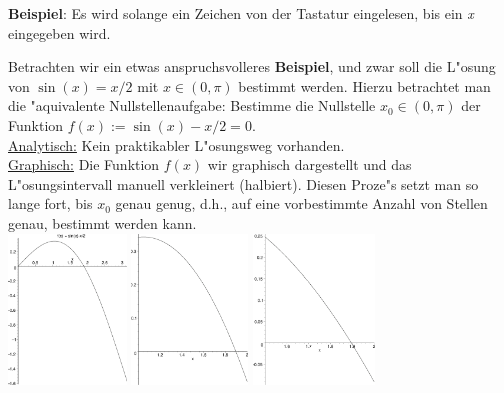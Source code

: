 \textbf{Beispiel}: Es wird solange ein Zeichen von der
Tastatur eingelesen, bis ein \textit{x} eingegeben wird.
%

Betrachten wir ein etwas anspruchsvolleres \textbf{Beispiel}, und zwar soll
die L"osung von $\sin(x) = x/2$ mit $x\in(0,\pi)$ bestimmt werden.
Hierzu betrachtet man die "aquivalente Nullstellenaufgabe: Bestimme
die Nullstelle $x_0\in(0,\pi)$ der Funktion
$f(x) := \sin(x) - x/2 = 0$\enspace.
\label{bsp:bisection0}
\\
\underline{Analytisch:} Kein praktikabler L"osungsweg vorhanden.
\\
\underline{Graphisch:} Die Funktion $f(x)$ wir graphisch dargestellt
und das L"osungsintervall manuell verkleinert (halbiert).
Diesen Proze"s setzt man so lange fort, bis $x_0$ genau genug,
d.h., auf eine vorbestimmte Anzahl von Stellen genau,
bestimmt werden kann. \\[0.5ex]
%
\includegraphics[height=4cm]{Ex46202.eps} \hfill
\includegraphics[height=4cm]{Ex46203.eps} \hfill
\includegraphics[height=4cm]{Ex46204.eps}
\\[0.5ex]
